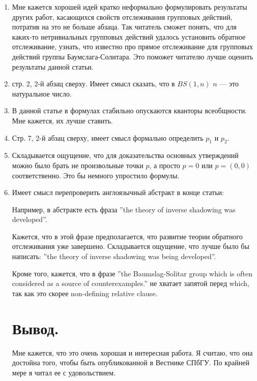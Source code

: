 \documentclass[12pt]{article}
\begin{document}
\begin{enumerate}
	\item Мне кажется хорошей идей кратко неформально формулировать результаты других работ, касающихся свойств отслеживания групповых действий, потратив на это не больше абзаца. Так читатель сможет понять, что для каких-то нетривиальных групповых действий удалось установить обратное отслеживание, узнать, что известно про прямое отслеживание для групповых действий группы Баумслага-Солитара. Это поможет читателю лучше оценить результаты данной статьи.
	\item стр. 2, 2-й абзац сверху. Имеет смысл сказать, что в $BS(1, n)$ $n$ --- это натуральное число.
	\item В данной статье в формулах стабильно опускаются кванторы всеобщности. Мне кажется, их лучше ставить.
	\item Стр. 7, 2-й абзац сверху, имеет смысл формально определить $p_1$ и $p_2$.
	\item Складывается ощущение, что для доказательства основных утверждений можно было брать не произвольные точки $p$, а просто $p = 0$ или $p = (0, 0)$ соответственно. Это бы немного упростило формулы.
\item Имеет смысл перепроверить англоязычный абстракт в конце статьи:

Например, в абстракте есть фраза ''the theory of inverse shadowing was developed''.

Кажется, что в этой фразе предполагается, что развитие теории обратного отслеживания уже завершено. Складывается ощущение, что лучше было бы написать:
''the theory of inverse shadowing was being developed''.

Кроме того, кажется, что в фразе
''the Baumslag-Solitar group which is often considered as a source of counterexamples.''
не хватает запятой перед which, так как это скорее non-defining relative clause.	

\section{Вывод.}

Мне кажется, что это очень хорошая и интересная работа. Я считаю, что она достойна того, чтобы быть опубликованной в Вестнике СПбГУ. По крайней мере я читал ее с удовольствием.

\end{enumerate}
\end{document}
